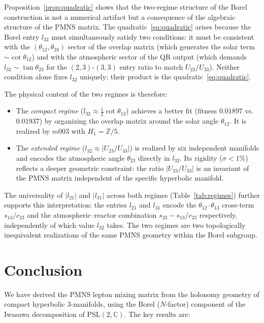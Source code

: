 \documentclass[floatfix,aps,prd,twocolumn,showpacs,superscriptaddress,longbibliography]{revtex4-2}
\newcommand{\PSL}{\mathrm{PSL}(2,\mathbb{C})}
\begin{document}
Proposition~\ref{prop:quadratic} shows that the two-regime structure
of the Borel construction is not a numerical artifact but a
consequence of the algebraic structure of the PMNS matrix.
The quadratic~\eqref{eq:quadratic} arises because the Borel
entry $l_{32}$ must simultaneously satisfy two conditions:
it must be consistent with the $(\theta_{12}, \theta_{23})$ sector
of the overlap matrix (which generates the solar term
$\sim\cot\theta_{12}$) and with the atmospheric sector of the
QR output (which demands $l_{32} \sim \tan\theta_{23}$ for the
$(2,3)$-$(3,3)$ entry ratio to match $U_{23}/U_{33}$).
Neither condition alone fixes $l_{32}$ uniquely; their product is
the quadratic~\eqref{eq:quadratic}.
 
The physical content of the two regimes is therefore:
\begin{itemize}
\item The \emph{compact regime} ($l_{32} \approx \tfrac{1}{2}\cot\theta_{12}$)
achieves a better fit (fitness $0.01897$ vs.\ $0.01937$) by
organizing the overlap matrix around the solar angle $\theta_{12}$.
It is realized by $m003$ with $H_1 = \mathbb{Z}/5$.
\item The \emph{extended regime} ($l_{32} \approx |U_{23}/U_{33}|$)
is realized by six independent manifolds and encodes the atmospheric
angle $\theta_{23}$ directly in $l_{32}$. Its rigidity ($\sigma < 1\%$)
reflects a deeper geometric constraint: the ratio $|U_{23}/U_{33}|$
is an invariant of the PMNS matrix independent of the specific
hyperbolic manifold.
\end{itemize}
 
The universality of $|l_{21}|$ and $|l_{31}|$ across both regimes
(Table~\ref{tab:regimes}) further supports this interpretation:
the entries $l_{21}$ and $l_{31}$ encode the $\theta_{12}$--$\theta_{13}$
cross-term $s_{13}/c_{23}$ and the atmospheric--reactor combination
$s_{23} - s_{13}/c_{23}$ respectively, independently of which
value $l_{32}$ takes.
The two regimes are two topologically inequivalent realizations of
the same PMNS geometry within the Borel subgroup.

\section{Conclusion}
\label{sec:conclusion}

We have derived the PMNS lepton mixing matrix from the holonomy
geometry of compact hyperbolic 3-manifolds, using the Borel
($N$-factor) component of the Iwasawa decomposition of $\PSL$.
The key results are:
\end{document}
